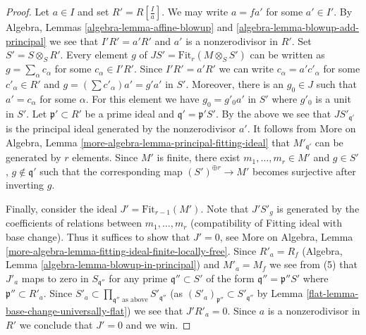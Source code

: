 \begin{proof}
\medskip\noindent
Let $a \in I$ and set $R' = R[\frac{I}{a}]$. We may write $a = fa'$
for some $a' \in I'$. By Algebra, Lemmas \ref{algebra-lemma-affine-blowup} and
\ref{algebra-lemma-blowup-add-principal} we see that $I' R' = a'R'$
and $a'$ is a nonzerodivisor in $R'$. Set $S' = S \otimes_S R'$.
Every element $g$ of $JS' = \text{Fit}_r(M \otimes_S S')$ can be
written as $g = \sum_\alpha c_\alpha$ for some $c_\alpha \in I'R'$.
Since $I'R' = a'R'$ we can write $c_\alpha = a'c'_\alpha$ for some
$c'_\alpha \in R'$ and $g = (\sum c'_\alpha)a' = g' a'$ in $S'$.
Moreover, there is an $g_0 \in J$ such that $a' = c_\alpha$
for some $\alpha$. For this element we have $g_0 = g'_0 a'$ in $S'$
where $g'_0$ is a unit in $S'$.
Let $\mathfrak p' \subset R'$ be
a prime ideal and $\mathfrak q' = \mathfrak p'S'$.
By the above we see that $JS'_{\mathfrak q'}$ is the
principal ideal generated by the nonzerodivisor $a'$.
It follows from More on Algebra, Lemma
\ref{more-algebra-lemma-principal-fitting-ideal}
that $M'_{\mathfrak q'}$ can be generated by $r$ elements.
Since $M'$ is finite, there exist $m_1, \ldots, m_r \in M'$ and
$g \in S'$, $g \not \in \mathfrak q'$ such that the corresponding map
$(S')^{\oplus r} \to M'$ becomes surjective after inverting $g$.

\medskip\noindent
Finally, consider the ideal $J' = \text{Fit}_{r - 1}(M')$.
Note that $J'S'_g$ is generated by the coefficients of relations between
$m_1, \ldots, m_r$ (compatibility of Fitting ideal with base change).
Thus it suffices to show that $J' = 0$, see
More on Algebra, Lemma
\ref{more-algebra-lemma-fitting-ideal-finite-locally-free}.
Since $R'_a = R_f$ (Algebra, Lemma \ref{algebra-lemma-blowup-in-principal})
and $M'_a = M_f$ we see from (5)
that $J'_a$ maps to zero in $S_{\mathfrak q''}$ for any prime
$\mathfrak q'' \subset S'$ of the form $\mathfrak q'' = \mathfrak p''S'$
where $\mathfrak p'' \subset R'_a$. Since
$S'_a \subset \prod_{\mathfrak q''\text{ as above}} S'_{\mathfrak q''}$
(as $(S'_a)_{\mathfrak p''} \subset S'_{\mathfrak q''}$ by
Lemma \ref{flat-lemma-base-change-universally-flat})
we see that $J'R'_a = 0$. Since $a$ is a nonzerodivisor in $R'$ we
conclude that $J' = 0$ and we win.
\end{proof}

